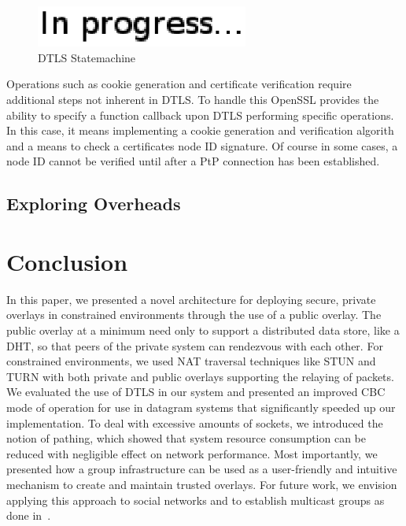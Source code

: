 \documentclass[conference]{IEEEtran}
\begin{document}
\begin{figure}[h]
\centering
\includegraphics[width=2.75in]{in_progress.eps}
\caption{DTLS Statemachine}
\label{fig:dtls_statemachine}
\end{figure}

Operations such as cookie generation and certificate verification require
additional steps not inherent in DTLS.  To handle this OpenSSL provides the
ability to specify a function callback upon DTLS performing specific operations.
In this case, it means implementing a cookie generation and verification
algorith and a means to check a certificates node ID signature.  Of course in
some cases, a node ID cannot be verified until after a PtP connection has been
established.

\subsection{Exploring Overheads}

\section{Conclusion}
\label{conclusions}
In this paper, we presented a novel architecture for deploying secure, private
overlays in constrained environments through the use of a public overlay.
The public overlay at a minimum need only to support a distributed data store,
like a DHT, so that peers of the private system can rendezvous with each other.
For constrained environments, we used NAT traversal techniques like STUN and
TURN with both private and public overlays supporting the relaying of packets.
We evaluated the use of DTLS in our system and presented an improved CBC
mode of operation for use in datagram systems that significantly speeded up our
implementation.  To deal with excessive amounts of sockets, we introduced the
notion of pathing, which showed that system resource consumption can be reduced
with negligible effect on network performance.  Most importantly, we presented
how a group infrastructure can be used as a user-friendly and intuitive
mechanism to create and maintain trusted overlays.  For future work, we envision
applying this approach to social networks and to establish multicast groups as
done in~\cite{can}.



\suppressfloats
\end{document}
